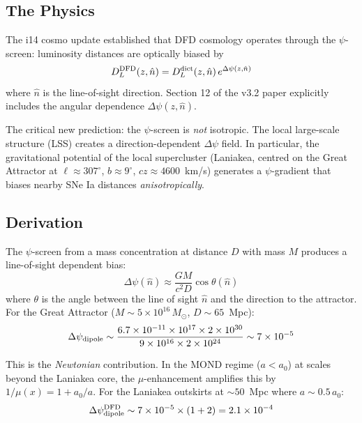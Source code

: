 \documentclass[11pt]{article}
\begin{document}
\subsection{The Physics}

The i14 cosmo update established that DFD cosmology operates through the
$\psi$-screen: luminosity distances are optically biased by
\begin{equation}
D_L^{\rm DFD}(z,\hat{n}) = D_L^{\rm dict}(z,\hat{n})\,e^{\Delta\psi(z,\hat{n})}
\end{equation}
where $\hat{n}$ is the line-of-sight direction.  Section 12 of the v3.2
paper explicitly includes the angular dependence $\Delta\psi(z,\hat{n})$.

The critical new prediction: the $\psi$-screen is \emph{not} isotropic.
The local large-scale structure (LSS) creates a direction-dependent
$\Delta\psi$ field.  In particular, the gravitational potential of the
local supercluster (Laniakea, centred on the Great Attractor at
$\ell \approx 307^\circ$, $b \approx 9^\circ$, $cz \approx 4600$~km/s)
generates a $\psi$-gradient that biases nearby SNe Ia distances
\emph{anisotropically}.

\subsection{Derivation}

The $\psi$-screen from a mass concentration at distance $D$ with mass $M$
produces a line-of-sight dependent bias:
\begin{equation}
\Delta\psi(\hat{n}) \approx \frac{GM}{c^2 D}\cos\theta(\hat{n})
\end{equation}
where $\theta$ is the angle between the line of sight $\hat{n}$ and the
direction to the attractor.  For the Great Attractor
($M \sim 5 \times 10^{16}\,M_\odot$, $D \sim 65$~Mpc):
\begin{equation}
\Delta\psi_{\rm dipole} \sim \frac{6.7 \times 10^{-11} \times 10^{17}
\times 2 \times 10^{30}}{9 \times 10^{16} \times 2 \times 10^{24}}
\sim 7 \times 10^{-5}
\end{equation}

This is the \emph{Newtonian} contribution.  In the MOND regime ($a < a_0$)
at scales beyond the Laniakea core, the $\mu$-enhancement amplifies this
by $1/\mu(x) = 1 + a_0/a$.  For the Laniakea outskirts at $\sim 50$~Mpc
where $a \sim 0.5\,a_0$:
\begin{equation}
\Delta\psi_{\rm dipole}^{\rm DFD} \sim 7 \times 10^{-5} \times (1 + 2)
= 2.1 \times 10^{-4}
\end{equation}
\end{document}
